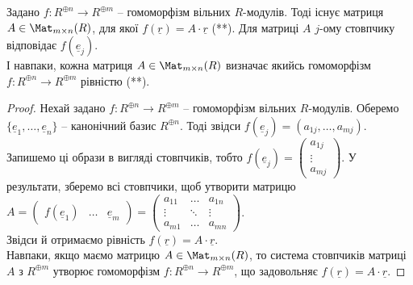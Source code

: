 \documentclass{math_library}
\begin{document}
\begin{corollary}
\label{homomorphism_matrix_representation}
Задано $f \colon R^{\oplus n} \to R^{\oplus m}$ -- гомоморфізм вільних $R$-модулів. Тоді існує матриця $A \in \Mat_{m \times n}(R)$, для якої $f(\underline{r}) = A \cdot \underline{r}$ (**). Для матриці $A$ $j$-ому стовпчику відповідає $f(\underline{e}_j)$.\\
І навпаки, кожна матриця $A \in \Mat_{m \times n}(R)$ визначає якийсь гомоморфізм $f \colon R^{\oplus n} \to R^{\oplus m}$ рівністю (**).
\end{corollary}

\begin{proof}
Нехай задано $f \colon R^{\oplus n} \to R^{\oplus m}$ -- гомоморфізм вільних $R$-модулів. Оберемо $\{\underline{e}_1,\dots,\underline{e}_n\}$ -- канонічний базис $R^{\oplus n}$. Тоді звідси $f(\underline{e}_j) = (a_{1j},\dots,a_{mj})$. Запишемо ці образи в вигляді стовпчиків, тобто $f(\underline{e}_j) = \begin{pmatrix}
a_{1j} \\ \vdots \\ a_{mj}
\end{pmatrix}$. У результати, зберемо всі стовпчики, щоб утворити матрицю \\
$A = \begin{pmatrix}
f(\underline{e}_1) & \dots & \underline{e}_m
\end{pmatrix} = \begin{pmatrix}
a_{11} & \dots & a_{1n} \\
\vdots & \ddots & \vdots \\
a_{m1} & \dots & a_{mn}
\end{pmatrix}$.\\
Звідси й отримаємо рівність $f(\underline{r}) = A \cdot \underline{r}$.
\bigskip \\
Навпаки, якщо маємо матрицю $A \in \Mat_{m \times n}(R)$, то система стовпчиків матриці $A$ з $R^{\oplus m}$ утворює гомоморфізм $f \colon R^{\oplus n} \to R^{\oplus m}$, що задовольняє $f(\underline{r}) = A \cdot \underline{r}$.
\end{proof}
\end{document}
